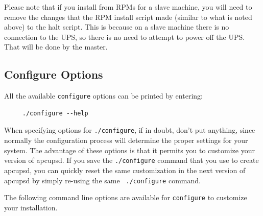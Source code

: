 Please note that if you install from RPMs for a slave machine, you will need
to remove the changes that the RPM install script made (similar to what is
noted above) to the halt script. This is because on a slave machine there is
no connection to the UPS, so there is no need to attempt to power off the UPS.
That will be done by the master. 

\label{Configure-Options}

\subsection*{Configure Options}

\label{index-configure-options-24}
\label{index-options_002c-configure-25}
All the available {\tt configure} options can be printed by entering: 

\footnotesize
\begin{verbatim}
     ./configure --help
\end{verbatim}
\normalsize

When specifying options for {\tt ./configure}, if in doubt, don't put
anything, since normally the configuration process will determine the proper
settings for your system. The advantage of these options is that it permits
you to customize your version of apcupsd.  If you save the {\tt ./configure}
command that you use to create apcupsd, you can quickly reset the same
customization in the next version of apcupsd by simply re-using the same {\tt
./configure} command.  

The following command line options are available for {\tt configure} to
customize your installation. 
\label{index-options_002c-_002d_002d_002dprefix-26}


